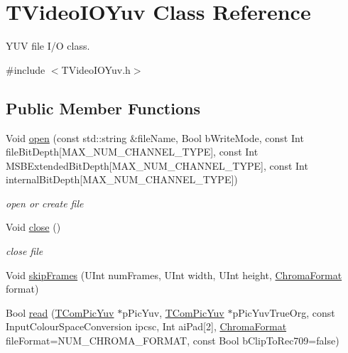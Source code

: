 \hypertarget{class_t_video_i_o_yuv}{}\section{T\+Video\+I\+O\+Yuv Class Reference}
\label{class_t_video_i_o_yuv}


Y\+UV file I/O class.  




{\ttfamily \#include $<$T\+Video\+I\+O\+Yuv.\+h$>$}

\subsection*{Public Member Functions}
\begin{DoxyCompactItemize}
\item 
Void \hyperlink{class_t_video_i_o_yuv_a65a9025501cfaa3d9c682d1a51c5d458}{open} (const std\+::string \&file\+Name, Bool b\+Write\+Mode, const Int file\+Bit\+Depth\mbox{[}M\+A\+X\+\_\+\+N\+U\+M\+\_\+\+C\+H\+A\+N\+N\+E\+L\+\_\+\+T\+Y\+PE\mbox{]}, const Int M\+S\+B\+Extended\+Bit\+Depth\mbox{[}M\+A\+X\+\_\+\+N\+U\+M\+\_\+\+C\+H\+A\+N\+N\+E\+L\+\_\+\+T\+Y\+PE\mbox{]}, const Int internal\+Bit\+Depth\mbox{[}M\+A\+X\+\_\+\+N\+U\+M\+\_\+\+C\+H\+A\+N\+N\+E\+L\+\_\+\+T\+Y\+PE\mbox{]})
\begin{DoxyCompactList}\small\item\em open or create file \end{DoxyCompactList}\item 
\mbox{\label{class_t_video_i_o_yuv_a6f4cf21b7363356645639f05a1318635}} 
Void \hyperlink{class_t_video_i_o_yuv_a6f4cf21b7363356645639f05a1318635}{close} ()
\begin{DoxyCompactList}\small\item\em close file \end{DoxyCompactList}\item 
Void \hyperlink{class_t_video_i_o_yuv_ae5c8dd5ff37103f2ed1f54b75ea05b6f}{skip\+Frames} (U\+Int num\+Frames, U\+Int width, U\+Int height, \hyperlink{_type_def_8h_a4a6c51c10f2eb04abc7209db7caff39f}{Chroma\+Format} format)
\item 
Bool \hyperlink{class_t_video_i_o_yuv_ac709b426a47663adb1f05a1aadebbe1c}{read} (\hyperlink{class_t_com_pic_yuv}{T\+Com\+Pic\+Yuv} $\ast$p\+Pic\+Yuv, \hyperlink{class_t_com_pic_yuv}{T\+Com\+Pic\+Yuv} $\ast$p\+Pic\+Yuv\+True\+Org, const Input\+Colour\+Space\+Conversion ipcsc, Int ai\+Pad\mbox{[}2\mbox{]}, \hyperlink{_type_def_8h_a4a6c51c10f2eb04abc7209db7caff39f}{Chroma\+Format} file\+Format=N\+U\+M\+\_\+\+C\+H\+R\+O\+M\+A\+\_\+\+F\+O\+R\+M\+AT, const Bool b\+Clip\+To\+Rec709=false)

\end{DoxyCompactItemize}
